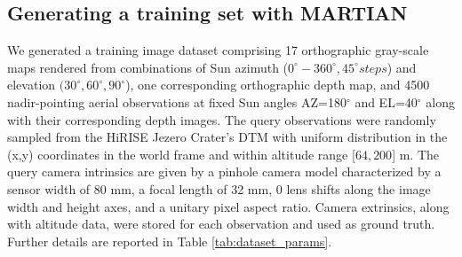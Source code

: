 
\subsection{Generating a training set with MARTIAN}
\label{subsec:training_set}
We generated a training image dataset comprising 17 orthographic gray-scale maps rendered from combinations of Sun azimuth ($0^{\circ}-360^{\circ}, 45^{\circ} steps$) and elevation $(30^{\circ}, 60^{\circ}, 90^{\circ}$), one corresponding orthographic depth map, and 4500 nadir-pointing aerial observations at fixed Sun angles AZ=180$^{\circ}$ and EL=40$^{\circ}$ along with their corresponding depth images. The query observations were randomly sampled from the HiRISE Jezero Crater's DTM with uniform distribution in the (x,y) coordinates in the world frame and within altitude range [$64, 200$] m. The query camera intrinsics are given by a pinhole camera model characterized by a sensor width of 80 mm, a focal length of 32 mm, 0 lens shifts along the image width and height axes, and a unitary pixel aspect ratio. Camera extrinsics, along with altitude data, were stored for each observation and used as ground truth. Further details are reported in Table \ref{tab:dataset_params}.

